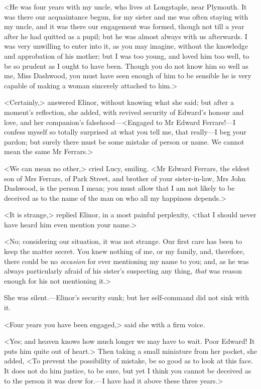 <He was four years with my uncle, who lives at Longstaple, near Plymouth. It was there our acquaintance begun, for my sister and me was often staying with my uncle, and it was there our engagement was formed, though not till a year after he had quitted as a pupil; but he was almost always with us afterwards. I was very unwilling to enter into it, as you may imagine, without the knowledge and approbation of his mother; but I was too young, and loved him too well, to be so prudent as I ought to have been. Though you do not know him so well as me, Miss Dashwood, you must have seen enough of him to be sensible he is very capable of making a woman sincerely attached to him.>

<Certainly,> answered Elinor, without knowing what she said; but after a moment's reflection, she added, with revived security of Edward's honour and love, and her companion's falsehood—<Engaged to Mr Edward Ferrars!—I confess myself so totally surprised at what you tell me, that really—I beg your pardon; but surely there must be some mistake of person or name. We cannot mean the same Mr Ferrars.>

<We can mean no other,> cried Lucy, smiling. <Mr Edward Ferrars, the eldest son of Mrs Ferrars, of Park Street, and brother of your sister-in-law, Mrs John Dashwood, is the person I mean; you must allow that I am not likely to be deceived as to the name of the man on who all my happiness depends.>

<It is strange,> replied Elinor, in a most painful perplexity, <that I should never have heard him even mention your name.>

<No; considering our situation, it was not strange. Our first care has been to keep the matter secret. You knew nothing of me, or my family, and, therefore, there could be no \textit{occasion} for ever mentioning my name to you; and, as he was always particularly afraid of his sister's suspecting any thing, \textit{that} was reason enough for his not mentioning it.>

She was silent.—Elinor's security sunk; but her self-command did not sink with it.

<Four years you have been engaged,> said she with a firm voice.

<Yes; and heaven knows how much longer we may have to wait. Poor Edward! It puts him quite out of heart.> Then taking a small miniature from her pocket, she added, <To prevent the possibility of mistake, be so good as to look at this face. It does not do him justice, to be sure, but yet I think you cannot be deceived as to the person it was drew for.—I have had it above these three years.>

